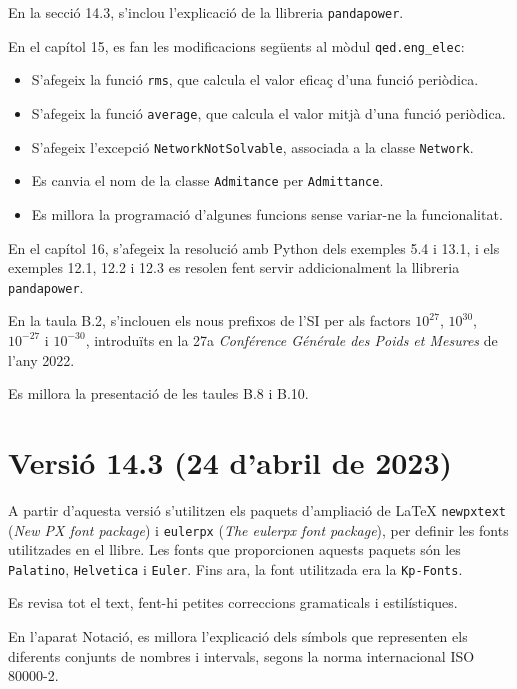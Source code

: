 En la secció 14.3, s'inclou l'explicació de la llibreria \texttt{pandapower}.


En el capítol 15, es fan les modificacions següents al mòdul  \texttt{qed.eng\_elec}:
\begin{itemize}
	\item S'afegeix la funció \texttt{rms}, que calcula el valor eficaç d'una funció periòdica.
	\item S'afegeix la funció \texttt{average}, que calcula el valor mitjà d'una funció periòdica.
	\item S'afegeix l'excepció \texttt{NetworkNotSolvable}, associada a la classe \texttt{Network}.
	\item Es canvia el nom de la classe \texttt{Admitance} per \texttt{Admittance}.
	\item Es millora la programació d'algunes funcions sense variar-ne la funcionalitat.
\end{itemize}


En el capítol 16, s'afegeix la resolució amb Python dels exemples 5.4  i  13.1, i els exemples 12.1, 12.2 i 12.3 es resolen  fent servir addicionalment la llibreria \texttt{pandapower}.

En la taula B.2, s'inclouen els  nous prefixos de l'SI per als factors $10^{27}$,  $10^{30}$,  $10^{-27}$ i  $10^{-30}$, introduïts en la 27a \textit{Conférence Générale des Poids et Mesures} de l'any 2022.

Es millora la presentació de les taules B.8 i B.10.


\section*{Versió 14.3 (24 d'abril de 2023)}

A partir d'aquesta versió s'utilitzen els paquets d'ampliació de \LaTeX{}
\texttt{newpxtext} (\textit{New PX font package}) i \texttt{eulerpx} (\textit{The eulerpx font package}), per definir les fonts utilitzades en el llibre. Les fonts que proporcionen aquests paquets són les \texttt{Palatino}, \texttt{Helvetica} i \AmS{} \texttt{Euler}.
Fins ara, la font utilitzada era la \texttt{Kp-Fonts}.

Es revisa tot el text, fent-hi petites correccions gramaticals i estilístiques.

En l'aparat Notació, es millora l'explicació dels símbols que representen els diferents conjunts de nombres i intervals, segons la norma internacional ISO 80000-2.

